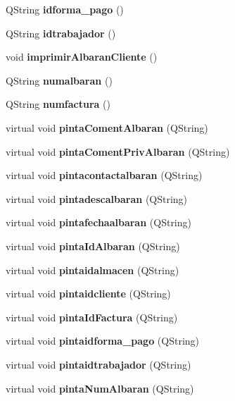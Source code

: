 \begin{CompactItemize}
\item 
QString {\bf idforma\_\-pago} ()\label{classAlbaranCliente_a15}

\item 
QString {\bf idtrabajador} ()\label{classAlbaranCliente_a16}

\item 
void {\bf imprimir\-Albaran\-Cliente} ()
\item 
QString {\bf numalbaran} ()\label{classAlbaranCliente_a18}

\item 
QString {\bf numfactura} ()\label{classAlbaranCliente_a19}

\item 
virtual void {\bf pinta\-Coment\-Albaran} (QString)\label{classAlbaranCliente_a20}

\item 
virtual void {\bf pinta\-Coment\-Priv\-Albaran} (QString)\label{classAlbaranCliente_a21}

\item 
virtual void {\bf pintacontactalbaran} (QString)\label{classAlbaranCliente_a22}

\item 
virtual void {\bf pintadescalbaran} (QString)\label{classAlbaranCliente_a23}

\item 
virtual void {\bf pintafechaalbaran} (QString)\label{classAlbaranCliente_a24}

\item 
virtual void {\bf pinta\-Id\-Albaran} (QString)\label{classAlbaranCliente_a25}

\item 
virtual void {\bf pintaidalmacen} (QString)\label{classAlbaranCliente_a26}

\item 
virtual void {\bf pintaidcliente} (QString)\label{classAlbaranCliente_a27}

\item 
virtual void {\bf pinta\-Id\-Factura} (QString)\label{classAlbaranCliente_a28}

\item 
virtual void {\bf pintaidforma\_\-pago} (QString)\label{classAlbaranCliente_a29}

\item 
virtual void {\bf pintaidtrabajador} (QString)\label{classAlbaranCliente_a30}

\item 
virtual void {\bf pinta\-Num\-Albaran} (QString)\label{classAlbaranCliente_a31}


\end{CompactItemize}
